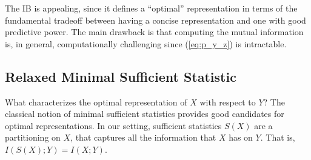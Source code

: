 \documentclass[11pt]{article}
\begin{document}
The IB is appealing, since it defines a ``optimal'' representation in terms of the fundamental tradeoff between having a concise representation and one with good predictive power. The main drawback is that computing the mutual information is, in general, computationally challenging since (\ref{eq:p_y_z}) is intractable.

\subsection*{Relaxed Minimal Sufficient Statistic}

What characterizes the optimal representation of $X$ with respect to $Y$? The classical notion of minimal sufficient statistics provides good candidates for optimal representations. In our setting, sufficient statistics $S(X)$ are a partitioning on $X$, that captures all the information that $X$ has on $Y$. That is, $I(S(X); Y) = I(X;Y)$.
\end{document}

